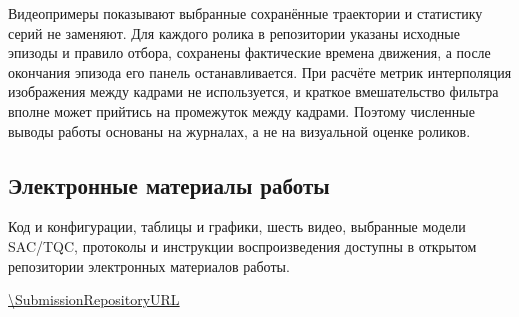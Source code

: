 Видеопримеры показывают выбранные сохранённые траектории и статистику серий не заменяют. Для каждого ролика в репозитории указаны исходные эпизоды и правило отбора, сохранены фактические времена движения, а после окончания эпизода его панель останавливается. При расчёте метрик интерполяция изображения между кадрами не используется, и краткое вмешательство фильтра вполне может прийтись на промежуток между кадрами. Поэтому численные выводы работы основаны на журналах, а не на визуальной оценке роликов.

\subsection*{Электронные материалы работы}
Код и конфигурации, таблицы и графики, шесть видео, выбранные модели SAC/TQC, протоколы и инструкции воспроизведения доступны в открытом репозитории электронных материалов работы.
\begin{center}\small\url{\SubmissionRepositoryURL}\end{center}

